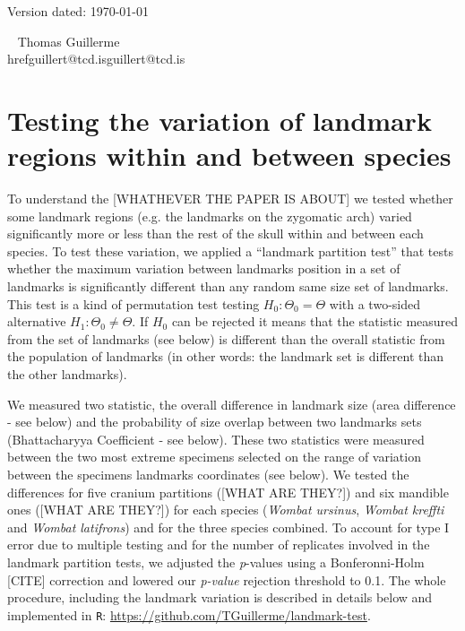 \documentclass[a4paper,11pt]{article}
\begin{document}
\begin{flushright}
Version dated: \today
\end{flushright}
\begin{center}

\
\bigskip
Thomas Guillerme\\href{guillert@tcd.is}{guillert@tcd.is}

\end{center}

\section{Testing the variation of landmark regions within and between species}

To understand the [WHATHEVER THE PAPER IS ABOUT] we tested whether some landmark regions (e.g. the landmarks on the zygomatic arch) varied significantly more or less than the rest of the skull within and between each species.
To test these variation, we applied a  ``landmark partition test'' that tests whether the maximum variation between landmarks position in a set of landmarks is significantly different than any random same size set of landmarks.
This test is a kind of permutation test testing $H_{0}: \Theta_{0} = \Theta$ with a two-sided alternative $H_{1}: \Theta_{0} \neq \Theta$.
If $H_{0}$ can be rejected it means that the statistic measured from the set of landmarks (see below) is different than the overall statistic from the population of landmarks (in other words: the landmark set is different than the other landmarks).

We measured two statistic, the overall difference in landmark size (area difference - see below) and the probability of size overlap between two landmarks sets (Bhattacharyya Coefficient - see below).
These two statistics were measured between the two most extreme specimens selected on the range of variation between the specimens landmarks coordinates (see below).
We tested the differences for five cranium partitions ([WHAT ARE THEY?]) and six mandible ones ([WHAT ARE THEY?]) for each species (\textit{Wombat ursinus}, \textit{Wombat kreffti} and \textit{Wombat latifrons}) and for the three species combined.
To account for type I error due to multiple testing and for the number of replicates involved in the landmark partition tests, we adjusted the \textit{p}-values using a Bonferonni-Holm [CITE] correction and lowered our \textit{p-value} rejection threshold to 0.1.
The whole procedure, including the landmark variation is described in details below and implemented in \texttt{R}: \url{https://github.com/TGuillerme/landmark-test}.
\end{document}
